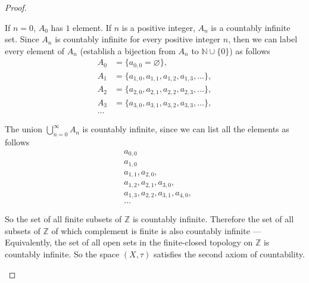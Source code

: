 \begin{proof}
\begin{enumerate}[label={(\roman*)}]
              If $n = 0$, $A_{0}$ has $1$ element. If $n$ is a positive integer, $A_{n}$ is a countably infinite set. Since $A_{n}$ is countably infinite for every positive integer $n$, then we can label every element of $A_{n}$ (establish a bijection from $A_{n}$ to $\mathbb{N}\cup\{0\}$) as follows
              \begin{align*}
                  A_{0}  & = \{ a_{0,0} = \varnothing \},                     \\
                  A_{1}  & = \{ a_{1,0}, a_{1,1}, a_{1,2}, a_{1,3},\ldots \}, \\
                  A_{2}  & = \{ a_{2,0}, a_{2,1}, a_{2,2}, a_{2,3},\ldots \}, \\
                  A_{3}  & = \{ a_{3,0}, a_{3,1}, a_{3,2}, a_{3,3},\ldots \}, \\
                  \ldots &
              \end{align*}

              The union $\bigcup^{\infty}_{n=0} A_{n}$ is countably infinite, since we can list all the elements as follows
              \begin{align*}
                   & a_{0,0}                             \\
                   & a_{1,0}                             \\
                   & a_{1,1}, a_{2,0},                   \\
                   & a_{1,2}, a_{2,1}, a_{3,0},          \\
                   & a_{1,3}, a_{2,2}, a_{3,1}, a_{4,0}, \\
                   & \ldots
              \end{align*}

              So the set of all finite subsets of $\mathbb{Z}$ is countably infinite. Therefore the set of all subsets of $\mathbb{Z}$ of which complement is finite is also countably infinite --- Equivalently, the set of all open sets in the finite-closed topology on $\mathbb{Z}$ is countably infinite. So the space $(X, \tau)$ satisfies the second axiom of countability.
    \end{enumerate}
\end{proof}
\newpage


